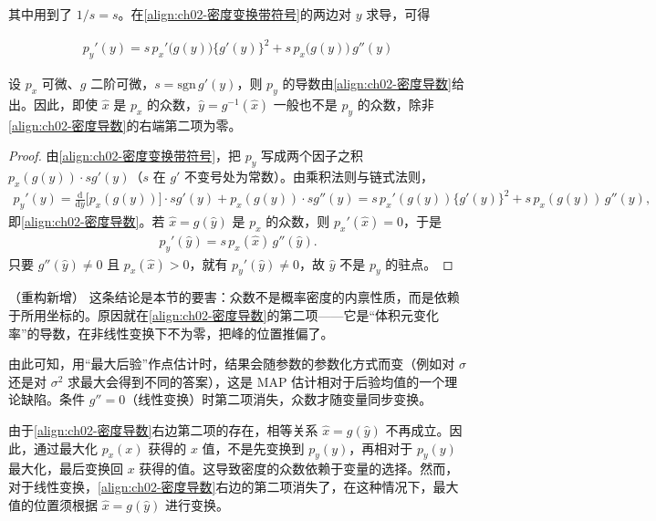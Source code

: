 \documentclass[../../main.tex]{subfiles}
\begin{document}
其中用到了 $1/s=s$。在\eqref{align:ch02-密度变换带符号}的两边对 $y$ 求导，可得

\begin{align}
  p_y'(y) = s\,p_x'\big(g(y)\big)\big\{g'(y)\big\}^{2} + s\,p_x\big(g(y)\big)\,g''(y)
  \label{align:ch02-密度导数}
\end{align}

\begin{proposition}[密度的众数依赖于变量的选择]\label{proposition:ch02-密度众数依赖变量}
设 $p_x$ 可微、$g$ 二阶可微，$s=\mathrm{sgn}\,g'(y)$，则 $p_y$ 的导数由\eqref{align:ch02-密度导数}给出。因此，即使 $\hat{x}$ 是 $p_x$ 的众数，$\hat{y}=g^{-1}(\hat{x})$ 一般也不是 $p_y$ 的众数，除非\eqref{align:ch02-密度导数}的右端第二项为零。
\end{proposition}

\begin{proof}
由\eqref{align:ch02-密度变换带符号}，把 $p_y$ 写成两个因子之积 $p_x(g(y))\cdot s g'(y)$（$s$ 在 $g'$ 不变号处为常数）。由乘积法则与链式法则，
\begin{align*}
  p_y'(y) = \frac{\mathrm{d}}{\mathrm{d}y}\big[p_x(g(y))\big]\cdot s g'(y) + p_x(g(y))\cdot s g''(y)
  = s\,p_x'(g(y))\{g'(y)\}^{2} + s\,p_x(g(y))\,g''(y) ,
\end{align*}
即\eqref{align:ch02-密度导数}。若 $\hat{x}=g(\hat{y})$ 是 $p_x$ 的众数，则 $p_x'(\hat{x})=0$，于是
\begin{align*}
  p_y'(\hat{y}) = s\,p_x(\hat{x})\,g''(\hat{y}) .
\end{align*}
只要 $g''(\hat{y})\neq0$ 且 $p_x(\hat{x})>0$，就有 $p_y'(\hat{y})\neq0$，故 $\hat y$ 不是 $p_y$ 的驻点。
\end{proof}

\begin{remark}（重构新增）
这条结论是本节的要害：众数不是概率密度的内禀性质，而是依赖于所用坐标的。原因就在\eqref{align:ch02-密度导数}的第二项——它是“体积元变化率”的导数，在非线性变换下不为零，把峰的位置推偏了。

由此可知，用“最大后验”作点估计时，结果会随参数的参数化方式而变（例如对 $\sigma$ 还是对 $\sigma^{2}$ 求最大会得到不同的答案），这是 MAP 估计相对于后验均值的一个理论缺陷。条件 $g''=0$（线性变换）时第二项消失，众数才随变量同步变换。
\end{remark}

由于\eqref{align:ch02-密度导数}右边第二项的存在，相等关系 $\hat{x}=g(\hat{y})$ 不再成立。因此，通过最大化 $p_x(x)$ 获得的 $x$ 值，不是先变换到 $p_y(y)$，再相对于 $p_y(y)$ 最大化，最后变换回 $x$ 获得的值。这导致密度的众数依赖于变量的选择。然而，对于线性变换，\eqref{align:ch02-密度导数}右边的第二项消失了，在这种情况下，最大值的位置须根据 $\hat{x}=g(\hat{y})$ 进行变换。
\end{document}
